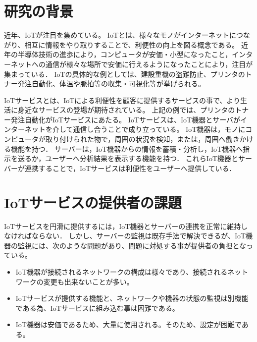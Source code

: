 \begin{comment}
IoTサービスというものがある。
IoTサービスはこんな構造をしている。
だけど、IoTサービスの開発・運用は大変
・開発者が開発するのが大変
・運用者が維持することが大変

なので、監視が必要です。

本論文では、〇〇と△△といった方法で、監視システムを開発することにより、
IoTサービスの開発者と運用者の負担を軽減する事を目指す。
\end{comment}



\section{研究の背景}
近年、IoTが注目を集めている。
IoTとは、様々なモノがインターネットにつながり、相互に情報をやり取りすることで、利便性の向上を図る概念である。
近年の半導体技術の進歩により，コンピュータが安価・小型になったこと，インターネットへの通信が様々な場所で安価に行えるようになったことにより，注目が集まっている．
IoTの具体的な例としては、建設重機の盗難防止、プリンタのトナー発注自動化、体温や脈拍等の収集・可視化等が挙げられる。
\medskip

IoTサービスとは、IoTによる利便性を顧客に提供するサービスの事で、より生活に身近なサービスの登場が期待されている。
上記の例では、プリンタのトナー発注自動化がIoTサービスにあたる。
IoTサービスは、IoT機器とサーバがインターネットを介して通信し合うことで成り立っている。
IoT機器は，モノにコンピュータが取り付けられた物で，周囲の状況を検知，または，周囲へ働きかける機能を持つ．
サーバーは，IoT機器からの情報を蓄積・分析し，IoT機器へ指示を送るか，ユーザーへ分析結果を表示する機能を持つ．
これらIoT機器とサーバーが連携することで，IoTサービスは利便性をユーザーへ提供している．

\section{IoTサービスの提供者の課題}
IoTサービスを円滑に提供するには，IoT機器とサーバーの連携を正常に維持しなければならない．
しかし、サーバーの監視は既存手法で解決できるが、IoT機器の監視には、次のような問題があり、問題に対処する事が提供者の負担となっている。
\begin{itemize}
\item IoT機器が接続されるネットワークの構成は様々であり、接続されるネットワークの変更も出来ないことが多い。
\item IoTサービスが提供する機能と、ネットワークや機器の状態の監視は別機能である為、IoTサービスに組み込む事は困難である。
\item IoT機器は安価であるため、大量に使用される。そのため、設定が困難である。
\end{itemize}


